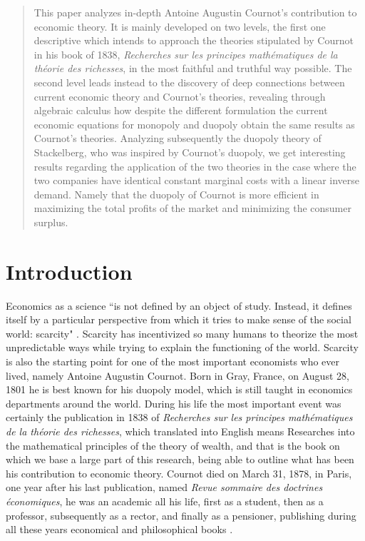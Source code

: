 \documentclass[12pt]{article}
\numberwithin{equation}{subsection}
\let\oldsection\section%
\renewcommand{\section}{%
  \renewcommand{\theequation}{\thesection.\arabic{equation}}%
  \oldsection}%
\begin{document}
\newpage
\renewcommand{\BRetrievedFrom}{}
\begin{abstract} \noindent This paper analyzes in-depth Antoine Augustin Cournot's contribution to economic theory. It is mainly developed on two levels, the first one descriptive which intends to approach the theories stipulated by Cournot in his book of 1838, \nocite{cournot1838recherches}\emph{Recherches sur les principes mathématiques de la théorie des richesses}, in the most faithful and truthful way possible. The second level leads instead to the discovery of deep connections between current economic theory and Cournot's theories, revealing through algebraic calculus how despite the different formulation the current economic equations for monopoly and duopoly obtain the same results as Cournot's theories. Analyzing subsequently the duopoly theory of Stackelberg, who was inspired by Cournot's duopoly, we get interesting results regarding the application of the two theories in the case where the two companies have identical constant marginal costs with a linear inverse demand. Namely that the duopoly of Cournot is more efficient in maximizing the total profits of the market and minimizing the consumer surplus.
\end{abstract}
\newpage
\tableofcontents
\newpage
\clearpage
{}
\section{Introduction}
\label{sec:intro}
Economics as a science ``is not defined by an object of study. Instead, it defines itself by a particular perspective from which it tries to make sense of the social world: scarcity" \cite[p. 4]{Kolmar_2022}. Scarcity has incentivized so many humans to theorize the most unpredictable ways while trying to explain the functioning of the world. Scarcity is also the starting point for one of the most important economists who ever lived, namely Antoine Augustin Cournot. Born in Gray, France, on August 28, 1801 \cite[p. V]{cournot1897researches} he is best known for his duopoly model, which is still taught in economics departments around the world. During his life the most important event was certainly the publication in 1838 of \emph{Recherches sur les principes mathématiques de la théorie des richesses}, which translated into English means Researches into the mathematical principles of the theory of wealth, and that is the book on which we base a large part of this research, being able to outline what has been his contribution to economic theory. Cournot died on March 31, 1878, in Paris, one year after his last publication, named \nocite{cournot1877recherches}\emph{Revue sommaire des doctrines économiques}, he was an academic all his life, first as a student, then as a professor, subsequently as a rector, and finally as a pensioner, publishing during all these years economical and philosophical books \cite[p. V]{cournot1897researches}.
\end{document}

